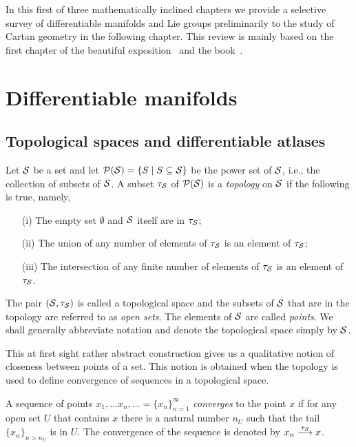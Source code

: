 \documentclass[
final,
11pt,
a4paper,
DIV=11,
headinclude=true,
footinclude=false,
bibliography=totoc,
twoside=true,  %
BCOR=5mm
]{scrbook}
\begin{document}
In this first of three mathematically inclined chapters we 
provide a selective survey of differentiable manifolds and Lie 
groups preliminarily to the study of Cartan geometry in the 
following chapter. This review is mainly based on the first 
chapter of the beautiful exposition~\cite{kob1996found} and the 
book~\cite{nakahara:2003gt}.

\section{Differentiable manifolds}

\subsection{Topological spaces and differentiable atlases}

\begin{definition}
Let $\mathcal{S}$ be a set and let $\mathcal{P}(\mathcal{S}) = \{ S \mid 
S \subseteq \mathcal{S} \}$ be the power set of $\mathcal{S}$, i.e., the 
collection of subsets of $\mathcal{S}$. A subset $\tau_\mathcal{S}$ of 
$\mathcal{P}(\mathcal{S})$ is a \emph{topology} on $\mathcal{S}$ if the 
following is true, namely,
\begin{itemize}
  \item[(i)] The empty set $\emptyset$ and $\mathcal{S}$ itself are in 
    $\tau_\mathcal{S}$;
  \item[(ii)] The union of any number of elements of 
    $\tau_\mathcal{S}$ is an element of $\tau_\mathcal{S}$;
  \item[(iii)] The intersection of any finite number of elements 
    of $\tau_\mathcal{S}$ is an element of $\tau_\mathcal{S}$.
\end{itemize}
The pair $(\mathcal{S},\tau_\mathcal{S})$ is called a topological space and 
the subsets of $\mathcal{S}$ that are in the topology are referred to 
as \emph{open sets}. The elements of $\mathcal{S}$ are called 
\emph{points}. We shall generally abbreviate notation and denote 
the topological space simply by $\mathcal{S}$.
\end{definition}

This at first sight rather abstract construction gives us a 
qualitative notion of closeness between points of a set. This 
notion is obtained when the topology is used to define 
convergence of sequences in a topological space.

\begin{definition}
A sequence of points $x_1, \ldots x_n, \ldots =
{\{x_n\}}_{n=1}^\infty$ \emph{converges} to the point $x$ if for 
any open set $U$ that contains $x$ there is a natural number 
$n_U$ such that the tail ${\{x_n\}}_{n > n_U}$ is in $U$. The 
convergence of the sequence is denoted by $x_n 
\overset{\tau_\mathcal{S}}{\longrightarrow} x$.
\end{definition}
\end{document}
